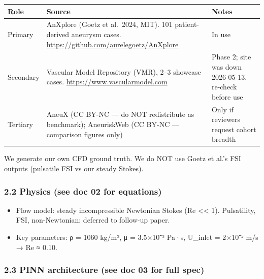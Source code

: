 \documentclass[
]{article}
\providecommand{\tightlist}{%
  \setlength{\itemsep}{0pt}\setlength{\parskip}{0pt}}
\begin{document}
\begin{longtable}[]{@{}
  >{\raggedright\arraybackslash}p{}
  >{\raggedright\arraybackslash}p{}
  >{\raggedright\arraybackslash}p{}@{}}
\toprule\noalign{}
\begin{minipage}[b]{\linewidth}\raggedright
Role
\end{minipage} & \begin{minipage}[b]{\linewidth}\raggedright
Source
\end{minipage} & \begin{minipage}[b]{\linewidth}\raggedright
Notes
\end{minipage} \\
\midrule\noalign{}
\endhead
\bottomrule\noalign{}
\endlastfoot
Primary & AnXplore (Goetz et al.~2024, MIT). 101 patient-derived
aneurysm cases. \url{https://github.com/aurelegoetz/AnXplore} & In
use \\
Secondary & Vascular Model Repository (VMR), 2--3 showcase cases.
\url{https://www.vascularmodel.com} & Phase 2; site was down 2026-05-13,
re-check before use \\
Tertiary & AneuX (CC BY-NC --- do NOT redistribute as benchmark);
AneuriskWeb (CC BY-NC --- comparison figures only) & Only if reviewers
request cohort breadth \\
\end{longtable}

We generate our own CFD ground truth. We do NOT use Goetz et al.'s FSI
outputs (pulsatile FSI vs our steady Stokes).

\subsubsection{2.2 Physics (see doc 02 for
equations)}\label{physics-see-doc-02-for-equations}

\begin{itemize}
\tightlist
\item
  Flow model: steady incompressible Newtonian Stokes (Re
  \textless\textless{} 1). Pulsatility, FSI, non-Newtonian: deferred to
  follow-up paper.
\item
  Key parameters: ρ = 1060 kg/m³, μ = 3.5×10⁻³ Pa·s, U\_inlet = 2×10⁻⁵
  m/s → Re ≈ 0.10.
\end{itemize}

\subsubsection{2.3 PINN architecture (see doc 03 for full
spec)}\label{pinn-architecture-see-doc-03-for-full-spec}
\end{document}
